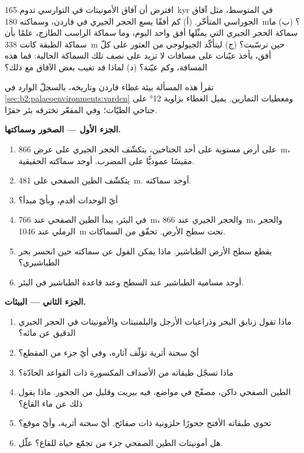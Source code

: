 \begin{exercise}[$\star\star\star$]\label{exo:b2:palaeoenvironments:12}
افترض أن آفاق الأمونيتات في التوارسي تدوم \qty{165}{kyr} في المتوسط، مثل آفاق الجوراسي المتأخّر.
(أ) كم أفقًا يسع الحجر الجيري في فاردن، وسماكته \qty{180}{m}؟ (ب) ما سماكة
الحجر الجيري التي يمثّلها أفق واحد اليوم، وما سماكة الراسب الطازج، علمًا بأن
سماكة الطبقة كانت \qty{338}{m} حين ترسّبت؟ (ج) ليتأكّد الجيولوجي من العثور على كلّ أفق،
يأخذ عيّنات على مسافات لا تزيد على نصف تلك السماكة الحالية: فما هذه المسافة، وكم
عيّنة؟ (د) لماذا قد تغيب بعض الآفاق مع ذلك؟
\end{exercise}

\begin{problem}\label{pb:b2:palaeoenvironments:1}
تقرأ هذه المسألة بيئة غطاء فاردن وتاريخه، بالسجلّ الوارد في
\cref{sec:b2:palaeoenvironments:varden} ومعطيات التمارين. يميل الغطاء
بزاوية \ang{12} على جناحي الطيّات؛ وفي المقعّر تخترقه بئر حفرًا.

\medskip\noindent\textbf{الجزء الأول --- الصخور وسماكتها.}
\begin{enumerate}
  \item على أرض مستوية على أحد الجناحين، يتكشّف الحجر الجيري على عرض \qty{866}{m}، مقيسًا
        عموديًّا على المضرب. أوجد سماكته الحقيقية.
  \item يتكشّف الطين الصفحي على \qty{481}{m}. أوجد سماكته.
  \item أيّ الوحدات أقدم، وبأيّ مبدأ؟
  \item في البئر، يبدأ الطين الصفحي عند \qty{766}{m}، والحجر الجيري عند \qty{866}{m}،
        والحجر الرملي عند \qty{1046}{m} تحت سطح الأرض. تحقّق من السماكات.
  \item يقطع سطح الأرض الطباشير. ماذا يمكن القول عن سماكته حين
        انحسر بحر الطباشيري؟
  \item أوجد مسامية الطباشير عند السطح وعند قاعدة الطباشير في البئر.
\end{enumerate}

\medskip\noindent\textbf{الجزء الثاني --- البيئات.}
\begin{enumerate}[resume]
  \item ماذا تقول زنابق البحر وذراعيات الأرجل والبلمنيتات والأمونيتات في الحجر الجيري الدقيق
        عن مائه؟
  \item أيّ سحنة أثرية تؤلّف آثاره، وفي أيّ جزء من المقطع؟
  \item ماذا تسجّل طبقاته من الأصداف المكسورة ذات القواعد الحادّة؟
  \item الطين الصفحي داكن، مصفّح في مواضع، فيه بيريت وقليل من الجحور. ماذا يقول ذلك
        عن ماء القاع؟
  \item تحوي طبقاته الأفتح جحورًا حلزونية ذات صفائح. أيّ سحنة أثرية، وأيّ موقع؟
  \item هل أمونيتات الطين الصفحي جزء من تجمّع حياة للقاع؟ علّل.
\end{enumerate}


\end{problem}
